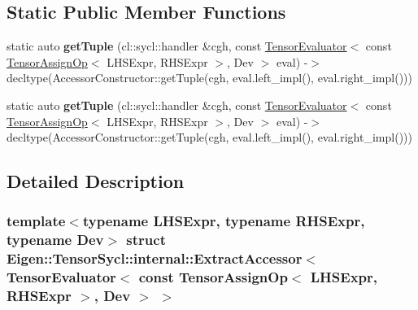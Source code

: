 \subsection*{Static Public Member Functions}
\begin{DoxyCompactItemize}
\item 
\mbox{\label{struct_eigen_1_1_tensor_sycl_1_1internal_1_1_extract_accessor_3_01_tensor_evaluator_3_01const_0166c12df3446bbeaad23ee09bbae83a69_a35c7c32cce31eda3837b2c62fd908973}} 
static auto {\bfseries get\+Tuple} (cl\+::sycl\+::handler \&cgh, const \hyperlink{struct_eigen_1_1_tensor_evaluator}{Tensor\+Evaluator}$<$ const \hyperlink{class_eigen_1_1_tensor_assign_op}{Tensor\+Assign\+Op}$<$ L\+H\+S\+Expr, R\+H\+S\+Expr $>$, Dev $>$ eval) -\/$>$ decltype(Accessor\+Constructor\+::get\+Tuple(cgh, eval.\+left\+\_\+impl(), eval.\+right\+\_\+impl()))
\item 
\mbox{\label{struct_eigen_1_1_tensor_sycl_1_1internal_1_1_extract_accessor_3_01_tensor_evaluator_3_01const_0166c12df3446bbeaad23ee09bbae83a69_a35c7c32cce31eda3837b2c62fd908973}} 
static auto {\bfseries get\+Tuple} (cl\+::sycl\+::handler \&cgh, const \hyperlink{struct_eigen_1_1_tensor_evaluator}{Tensor\+Evaluator}$<$ const \hyperlink{class_eigen_1_1_tensor_assign_op}{Tensor\+Assign\+Op}$<$ L\+H\+S\+Expr, R\+H\+S\+Expr $>$, Dev $>$ eval) -\/$>$ decltype(Accessor\+Constructor\+::get\+Tuple(cgh, eval.\+left\+\_\+impl(), eval.\+right\+\_\+impl()))
\end{DoxyCompactItemize}


\subsection{Detailed Description}
\subsubsection*{template$<$typename L\+H\+S\+Expr, typename R\+H\+S\+Expr, typename Dev$>$\newline
struct Eigen\+::\+Tensor\+Sycl\+::internal\+::\+Extract\+Accessor$<$ Tensor\+Evaluator$<$ const Tensor\+Assign\+Op$<$ L\+H\+S\+Expr, R\+H\+S\+Expr $>$, Dev $>$ $>$}

